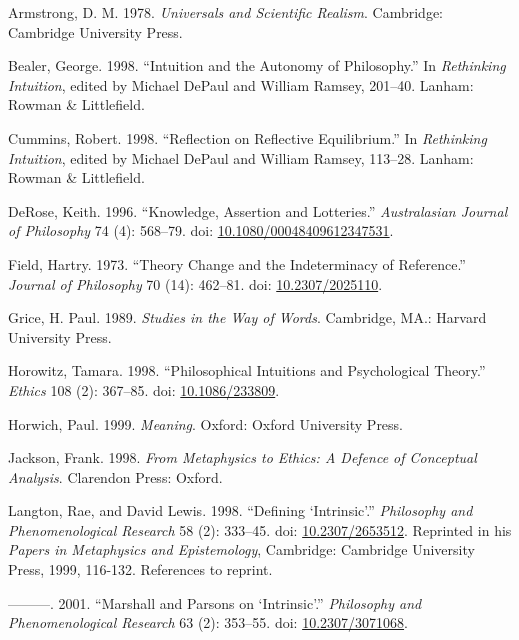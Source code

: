 \documentclass[
  10pt,
  letterpaper,
  DIV=11,
  numbers=noendperiod,
  twoside]{scrartcl}
\newlength{\cslhangindent}
\newenvironment{CSLReferences}[2] %
 {\begin{list}{}{%
  \setlength{\itemindent}{0pt}
  \setlength{\leftmargin}{0pt}
  \setlength{\parsep}{0pt}
  \ifodd #1
   \setlength{\leftmargin}{\cslhangindent}
   \setlength{\itemindent}{-1\cslhangindent}
  \fi
  \setlength{\itemsep}{#2\baselineskip}}}
 {\end{list}}
\begin{document}
\label{refs}
\begin{CSLReferences}{1}{0}
Armstrong, D. M. 1978. \emph{Universals and Scientific Realism}.
Cambridge: Cambridge University Press.

Bealer, George. 1998. {``Intuition and the Autonomy of Philosophy.''} In
\emph{Rethinking Intuition}, edited by Michael DePaul and William
Ramsey, 201--40. Lanham: Rowman \& Littlefield.

Cummins, Robert. 1998. {``Reflection on Reflective Equilibrium.''} In
\emph{Rethinking Intuition}, edited by Michael DePaul and William
Ramsey, 113--28. Lanham: Rowman \& Littlefield.

DeRose, Keith. 1996. {``Knowledge, Assertion and Lotteries.''}
\emph{Australasian Journal of Philosophy} 74 (4): 568--79. doi:
\href{https://doi.org/10.1080/00048409612347531}{10.1080/00048409612347531}.

Field, Hartry. 1973. {``Theory Change and the Indeterminacy of
Reference.''} \emph{Journal of Philosophy} 70 (14): 462--81. doi:
\href{https://doi.org/10.2307/2025110}{10.2307/2025110}.

Grice, H. Paul. 1989. \emph{Studies in the Way of Words}. Cambridge,
MA.: Harvard University Press.

Horowitz, Tamara. 1998. {``Philosophical Intuitions and Psychological
Theory.''} \emph{Ethics} 108 (2): 367--85. doi:
\href{https://doi.org/10.1086/233809}{10.1086/233809}.

Horwich, Paul. 1999. \emph{Meaning}. Oxford: Oxford University Press.

Jackson, Frank. 1998. \emph{From Metaphysics to Ethics: A Defence of
Conceptual Analysis}. Clarendon Press: Oxford.

Langton, Rae, and David Lewis. 1998. {``Defining {`Intrinsic'}.''}
\emph{Philosophy and Phenomenological Research} 58 (2): 333--45. doi:
\href{https://doi.org/10.2307/2653512}{10.2307/2653512}. Reprinted in
his \emph{Papers in Metaphysics and Epistemology}, Cambridge: Cambridge
University Press, 1999, 116-132. References to reprint.

---------. 2001. {``Marshall and {P}arsons on {`Intrinsic'}.''}
\emph{Philosophy and Phenomenological Research} 63 (2): 353--55. doi:
\href{https://doi.org/10.2307/3071068}{10.2307/3071068}.


\end{CSLReferences}
\end{document}
